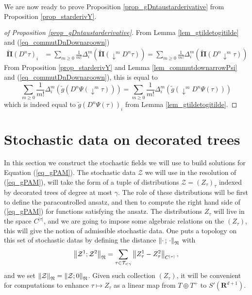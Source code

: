 \documentclass[11pt]{preprint}
\newcommand{\mcZ}{\mathcal{Z}}
\newcommand{\mcT}{\mathcal{T}}
\def\PPi{\boldsymbol{\Pi}}
\def\eqref#1{(\ref{#1})}
\newcommand{\bfR}{\mathbf{R}}
\newcommand{\norme}[1]{\left\lVert #1 \right\lVert}
\begin{document}
	We are now ready to prove Proposition \ref{prop_gDntaustarderivative} from  Proposition \ref{prop_starderivY}.
	
	\begin{proof}[of Proposition \ref{prop_gDntaustarderivative}]
		
		 From Lemma \ref{lem_gtildetogitilde} and \eqref{eq_commutDnDownaroown}
		\begin{align*}
			\widetilde{\PPi}(D^n\tau)_i &= \sum_{m\geq 0}\frac{1}{m!}\Delta_i^m\left(\widetilde{\PPi}(\downarrow^m D^n\tau)\right) 
			= \sum_{m\geq 0}\frac{1}{m!}\Delta_i^m\left(\widetilde{\PPi}(D^n\downarrow^m\tau)\right) 
		\end{align*}
		From Proposition \ref{prop_starderivY} and Lemma \ref{lem_commutdownarrowPsi} and \eqref{eq_commutDnDownaroown}, this is equal to
		$$
		\sum_{m\geq 0}\frac{1}{m!}\Delta_i^m\left(\widetilde{g}\left(D^n\Psi(\downarrow^m\tau)\right)\right)  
		= 	\sum_{m\geq 0}\frac{1}{m!}\Delta_i^m\left(\widetilde{g}\left(\downarrow^m D^n\Psi(\tau)\right)\right)  
		$$
		which is indeed equal to $\widetilde{g}(D^n\Psi(\tau))_i$ from Lemma \ref{lem_gtildetogitilde}.
		
		
	\end{proof}
	
	
	
	
	
	
	
	
 	\section{Stochastic data on decorated trees} \label{section_constructionZtau}
	
	In this section we construct the stochastic fields we will use to build solutions for Equation \eqref{eq_gPAM}. The stochastic data $\mcZ$ we will use in the resolution of \eqref{eq_gPAM}, will take the form of a tuple of distributions $\mcZ=(Z_\tau)_\tau$ indexed by decorated trees of degree at most $\gamma$. The role of these distributions will be first to define the paracontrolled ansatz, and then to compute the right hand side of \eqref{eq_gPAM} for functions satisfying the ansatz.
	The distributions $Z_\tau$ will live in the space $C^{|\tau|}$, and we are going to impose some algebraic relations on the $(Z_\tau)$, this will give the notion of admissible stochastic data. One puts a topology on this set of stochastic datas by defining the distance $\norme{  \cdot \, ; \,  \cdot }_{\frak N}$ with
	$$
	\norme{\mcZ^1;\mcZ^2}_{\frak N} = \sum_{\substack{\tau\in\mcT_{<\gamma}}} \norme{Z_\tau^1 - Z_\tau^2}_{C^{|\tau|}}, 
	$$
	and we set $\norme{\mcZ}_{\frak N} = \norme{\mcZ;0}_{\frak N}$.
	Given such collection $(Z_\tau)$, it will be convenient for computations to enhance $\tau\mapsto Z_\tau$ as a linear map from $T \oplus T^{+}$ to $S'(\bfR^{d+1})$.
	
\end{document}
